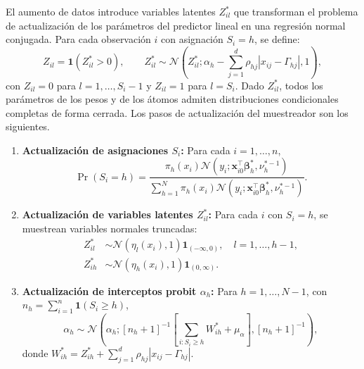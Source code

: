 El aumento de datos introduce variables latentes $Z_{il}^*$ que transforman el problema de actualización de los parámetros del predictor lineal en una regresión normal conjugada. Para cada observación $i$ con asignación $S_i = h$, se define:
\begin{equation}\label{eq:augmentation}
    Z_{il} = \mathbf{1}(Z_{il}^* > 0),
    \qquad
    Z_{il}^* \sim \mathcal{N}\!\left(Z_{il}^*;
    \alpha_h - \sum_{j=1}^{d}\rho_{hj}|x_{ij} - \Gamma_{hj}|,
    1\right),
\end{equation}
con $Z_{il} = 0$ para $l = 1, \dots, S_i - 1$ y $Z_{il} = 1$ para $l = S_i$. Dado $Z_{il}^*$, todos los parámetros de los pesos y de los átomos admiten distribuciones condicionales completas de forma cerrada. Los pasos de actualización del muestreador son los siguientes.
 
\begin{enumerate}
 
    \item \textbf{Actualización de asignaciones $S_i$:} Para cada
    $i = 1, \dots, n$,
    \begin{equation}
        \Pr(S_i = h) = \frac{\pi_h(x_i)
        \mathcal{N}(y_i; \mathbf{x}_{i0}^\top
        \boldsymbol{\beta}_h^*, \nu_h^{*-1})}
        {\sum_{h=1}^{N}\pi_h(x_i)
        \mathcal{N}(y_i; \mathbf{x}_{i0}^\top
        \boldsymbol{\beta}_h^*, \nu_h^{*-1})}.
    \end{equation}
 
    \item \textbf{Actualización de variables latentes $Z_{il}^*$:}
    Para cada $i$ con $S_i = h$, se muestrean variables normales
    truncadas:
    \begin{align*}
        Z_{il}^* &\sim \mathcal{N}\!\left(\eta_l(x_i), 1\right)
        \mathbf{1}_{(-\infty, 0)}, \quad l = 1, \dots, h-1,\\
        Z_{ih}^* &\sim \mathcal{N}\!\left(\eta_h(x_i), 1\right)
        \mathbf{1}_{(0, \infty)}.
    \end{align*}
 
    \item \textbf{Actualización de interceptos probit $\alpha_h$:}
    Para $h = 1, \dots, N-1$, con $n_h = \sum_{i=1}^n \mathbf{1}(S_i
    \geq h)$,
    \begin{equation}
        \alpha_h \sim \mathcal{N}\!\left(\alpha_h;
        [n_h + 1]^{-1}\!\left[\sum_{i: S_i \geq h} W_{ih}^*
        + \mu_\alpha\right], [n_h + 1]^{-1}\right),
    \end{equation}
    donde $W_{ih}^* = Z_{ih}^* + \sum_{j=1}^{d}\rho_{hj}
    |x_{ij} - \Gamma_{hj}|$.
 

\end{enumerate}
